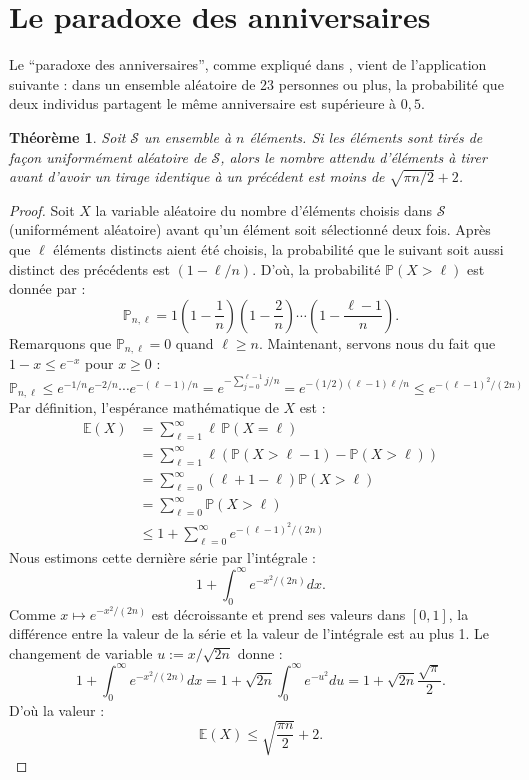 \documentclass[a4paper, titlepage]{article}
\newtheorem{theo}{Théorème}[section]
\theoremstyle{definition}
\theoremstyle{remark}
\begin{document}
\section{Le paradoxe des anniversaires}

Le ``paradoxe des anniversaires'', comme expliqué dans \cite[sous-section 14.1]{galbraith2012}, vient de l'application suivante : dans un ensemble aléatoire de 23 personnes ou plus, la probabilité que deux individus partagent le même anniversaire est supérieure à $0,5$.

\begin{theo}\label{paradoxeAnniversaire}
Soit $\mathcal S$ un ensemble à $n$ éléments. Si les éléments sont tirés de façon uniformément aléatoire de $\mathcal S$, alors le nombre attendu d'éléments à tirer avant d'avoir un tirage identique à un précédent est moins de $\sqrt{\pi n /2} + 2$.
\end{theo}

\begin{proof}
Soit $X$ la variable aléatoire du nombre d'éléments choisis dans $\mathcal S$ (uniformément aléatoire) avant qu'un élément soit sélectionné deux fois. Après que $\ell$ éléments distincts aient été choisis, la probabilité que le suivant soit aussi distinct des précédents est $(1-\ell/n)$. D'où, la probabilité $\mathbb{P}(X > \ell)$ est donnée par :
$$\mathbb{P}_{n,\ell} = 1\left(1-\frac{1}{n}\right)\left(1-\frac{2}{n}\right)\cdots\left(1-\frac{\ell-1}{n}\right).$$
Remarquons que $\mathbb{P}_{n,\ell} = 0$ quand $ \ell \geqslant n$. Maintenant, servons nous du fait que $1-x \leqslant e^{-x}$ pour $ x \geqslant 0$ :
$$\mathbb{P}_{n,\ell} \leqslant e^{-1/n}e^{-2/n}\cdots e^{-(\ell-1)/n} = e^{-\sum_{j=0}^{\ell -1} j/n} = e^{-(1/2)(\ell-1)\ell/n} \leqslant e^{-(\ell-1)^2/(2n)}$$
Par définition, l'espérance mathématique de $X$ est :
\begin{align*}
\mathbb{E}(X) &= \sum_{\ell = 1}^\infty \ell \, \mathbb{P}(X=\ell) \\
&= \sum_{\ell = 1}^\infty \ell \left(\mathbb{P}(X>\ell -1) - \mathbb{P}(X>\ell) \right)\\
&= \sum_{\ell = 0}^\infty (\ell + 1 -\ell)\mathbb{P}(X>\ell)\\
&= \sum_{\ell = 0}^\infty \mathbb{P}(X>\ell)\\
&\leqslant 1 + \sum_{\ell = 0}^\infty e^{-(\ell-1)^2/(2n)}
\end{align*}
Nous estimons cette dernière série par l'intégrale :
$$1 + \int_0^\infty e^{-x^2/(2n)}dx.$$
Comme $x \mapsto e^{-x^2/(2n)}$ est décroissante et prend ses valeurs dans $[0,1]$, la différence entre la valeur de la série et la valeur de l'intégrale est au plus 1. Le changement de variable $u := x/\sqrt{2n}$ donne :
$$1 + \int_0^\infty e^{-x^2/(2n)}dx = 1 + \sqrt{2n}\int_0^\infty e^{-u^2}du = 1 + \sqrt{2n}\frac{\sqrt{\pi}}{2}.$$
D'où la valeur :
$$\mathbb{E}(X) \leqslant \sqrt{\frac{\pi n}{2}} + 2.$$
\end{proof}

\newpage


\end{document}
